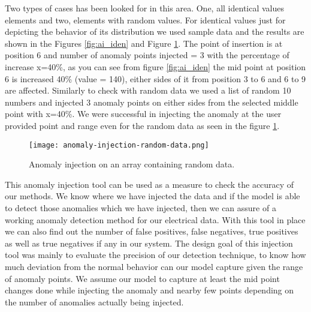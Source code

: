 Two types of cases has been looked for in this area. One, all identical values elements and two, elements with random values. For identical values just for depicting the behavior of its distribution we used sample data and the results are shown in the Figures \ref{fig:ai_iden} and  Figure \ref{fig:ai_rd}. The point of insertion is at position 6 and number of anomaly points injected = 3 with the percentage of increase x=40\%, as you can see from figure \ref{fig:ai_iden} the mid point at position 6 is increased 40\% (value = 140), either sides of it from position 3 to 6 and 6 to 9 are affected. Similarly to check with random data we used a list of random 10 numbers and injected 3 anomaly points on either sides from the selected middle point with x=40\%. We were successful in injecting the anomaly at the user provided point and range even for the random data as seen in the figure \ref{fig:ai_rd}. 
\begin{figure}
\centerline{\texttt{[image: anomaly-injection-random-data.png]}}
    \caption{Anomaly injection on an array containing random data.}
    \label{fig:ai_rd}
\end{figure}

This anomaly injection tool can be used as a measure to check the accuracy of our methods. We know where we have injected the data and if the model is able to detect those anomalies which we have injected, then we can assure of a working anomaly detection method for our electrical data. With this tool in place we can also find out the number of false positives, false negatives, true positives as well as true negatives if any in our system. The design goal of this injection tool was mainly to evaluate the precision of our detection technique, to know how much deviation from the normal behavior can our model capture given the range of anomaly points. We assume our model to capture at least the mid point changes done while injecting the anomaly and nearby few points depending on the number of anomalies actually being injected.




